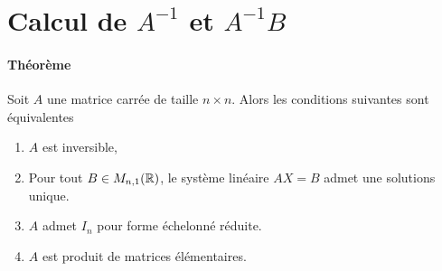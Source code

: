 %
%
\section{Calcul de $A^{-1}$ et $A^{-1} B$}
%
%

\paragraph{Théorème} Soit $A$ une matrice carrée de taille $n \times n$. Alors les conditions suivantes sont équivalentes
\begin{enumerate} 
  \item $A$ est inversible,
  \item Pour tout $B \in M_{n, 1}(\mathbb{R})$, le système linéaire $A X = B$ admet une solutions unique.
  \item $A$ admet $I_n$ pour forme échelonné réduite.
  \item $A$ est produit de matrices élémentaires.
\end{enumerate}

